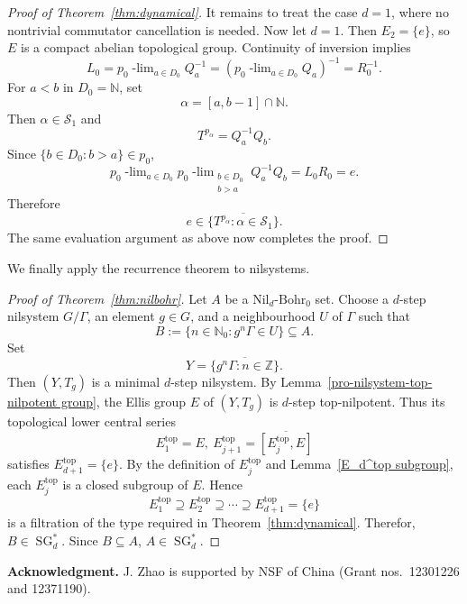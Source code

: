 \documentclass[11pt]{amsart}
\theoremstyle{definition}
\theoremstyle{remark}
\DeclareMathOperator{\SG}{SG}
\newcommand{\N}{\mathbb N}
\newcommand{\Nzero}{\mathbb N_0}
\newcommand{\Z}{\mathbb Z}
\newcommand{\ulim}[2]{#1\!\operatorname{-lim}_{#2}}
\newcommand{\NilBohr}[1]{\mathrm{Nil}_{#1}\text{-}\mathrm{Bohr}_0}
\begin{document}
\begin{proof}[Proof of Theorem~\ref{thm:dynamical}]
 
It remains to treat the case $d=1$, where no nontrivial commutator
cancellation is needed.
Now let $d=1$.  Then $E_2=\{e\}$, so $E$ is a compact abelian topological
group.  Continuity of inversion implies
\[
 L_0=\ulim{  p_0}{a\in D_0}Q_a^{-1}
 =\left(\ulim{  p_0}{a\in D_0}Q_a\right)^{-1}=R_0^{-1}.
\]
For $a<b$ in $D_0=\N$, set
\[
 \alpha=[a,b-1]\cap\N.
\]
Then $\alpha\in\mathcal S_1$ and
\[
 T^{p_\alpha}=Q_a^{-1}Q_b.
\]
Since $\{b\in D_0:b>a\}\in p_0$,
\[
 \ulim{ p_0}{a\in D_0}
 \ulim{  p_0}{\substack{b\in D_0\\b>a}}Q_a^{-1}Q_b
  =L_0R_0 =e.
\]
Therefore
\[
 e\in
 \overline{\{T^{p_\alpha}:\alpha\in\mathcal S_1\}}.
\]
 The same evaluation argument as above now completes the proof.
\end{proof}

We finally apply the recurrence theorem to nilsystems.

\begin{proof}[Proof of Theorem~\ref{thm:nilbohr}]
Let $A$ be a $\NilBohr{d}$ set.  Choose a $d$-step nilsystem $G/\Gamma$, an
element $g\in G$, and a neighbourhood $U$ of $\Gamma$ such that
\[
 B:=\{n\in\Nzero:g^n\Gamma\in U\}\subseteq A.
\]
Set
\[
 Y=\overline{\{g^n\Gamma:n\in\Z\}}.
\]
Then $(Y,T_g)$ is a minimal $d$-step nilsystem.
By Lemma~\ref{pro-nilsystem-top-nilpotent group}, the Ellis group $E$ of $(Y,T_g)$ is $d$-step top-nilpotent.  Thus its topological lower central series
\[
E_1^{\mathrm{top}}=E,\ E_{j+1}^{\mathrm{top}}=\overline{[E_j^{\mathrm{top}},E]}
\]
satisfies $E_{d+1}^{\mathrm{top}}=\{e\}$.
By the definition of $E_j^{\mathrm{top}}$ and Lemma~\ref{E_d^top subgroup},
each $E_j^{\mathrm{top}}$ is a closed subgroup of $E$.  Hence
\[
E_1^{\mathrm{top}}\supseteq E_2^{\mathrm{top}}\supseteq\cdots
\supseteq E_{d+1}^{\mathrm{top}}=\{e\}
\]
is a filtration of the type required in Theorem~\ref{thm:dynamical}.
Therefor, $B\in\SG_d^*$.
Since $B\subseteq A$, $A\in\SG_d^*$.

 

\end{proof}

\noindent \textbf{Acknowledgment.}
J. Zhao is supported by NSF of China (Grant nos.~12301226 and 12371190). 
\end{document}

